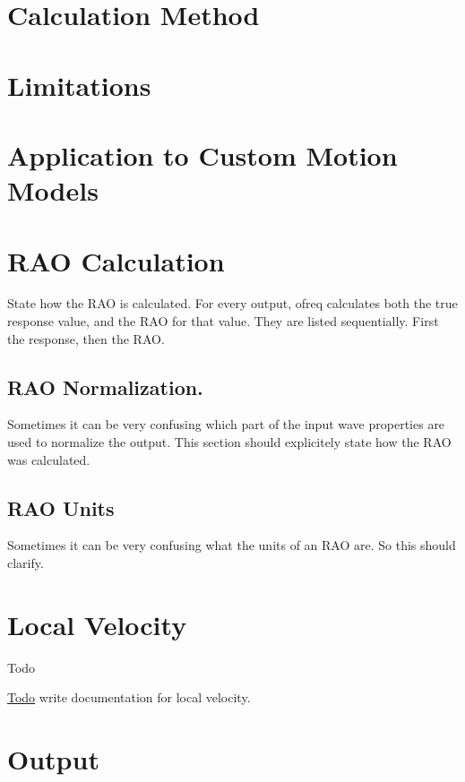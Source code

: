 \section*{Calculation Method}

\section*{Limitations}

\section*{Application to Custom Motion Models}

\section*{R\-A\-O Calculation}

State how the R\-A\-O is calculated. For every output, ofreq calculates both the true response value, and the R\-A\-O for that value. They are listed sequentially. First the response, then the R\-A\-O.

\subsection*{R\-A\-O Normalization.}

Sometimes it can be very confusing which part of the input wave properties are used to normalize the output. This section should explicitely state how the R\-A\-O was calculated.

\subsection*{R\-A\-O Units}

Sometimes it can be very confusing what the units of an R\-A\-O are. So this should clarify. \hypertarget{local_velocity}{}\section{Local Velocity}\label{local_velocity}
\begin{DoxyRefDesc}{Todo}
\item[\hyperlink{todo__todo000023}{Todo}]write documentation for local velocity.\end{DoxyRefDesc}


\section*{Output}

